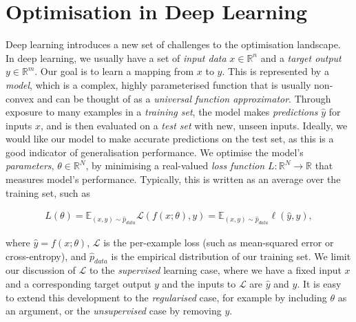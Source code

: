 \section{Optimisation in Deep Learning}

\label{sec:optimisation_in_deep_learning}






Deep learning introduces a new set of challenges to the optimisation landscape. In deep learning, we usually have a set of \textit{input data} $x \in \mathbb{R}^n$ and a \textit{target output} $y \in \mathbb{R}^m$. Our goal is to learn a mapping from $x$ to $y$. This is represented by a \textit{model}, which is a complex, highly parameterised function that is usually non-convex and can be thought of as a \textit{universal function approximator}. Through exposure to many examples in a \textit{training set}, the model makes \textit{predictions} $\hat{y}$ for inputs $x$, and is then evaluated on a \textit{test set} with new, unseen inputs. Ideally, we would like our model to make accurate predictions on the test set, as this is a good indicator of generalisation performance. We optimise the model's \textit{parameters}, $\theta \in \mathbb{R}^N$, by minimising a real-valued \textit{loss function} $L: \mathbb{R}^N \to \mathbb{R}$ that measures model's performance. Typically, this is written as an average over the training set, such as

\begin{align}

    L(\theta) = \mathbb{E}_{(x, y) \sim \hat{p}_{data}} \mathcal{L}(f(x; \theta), y) = \mathbb{E}_{(x, y) \sim \hat{p}_{data}} \ell(\hat{y}, y),

\end{align}

where $\hat{y} = f(x; \theta)$, $\mathcal{L}$ is the per-example loss (such as mean-squared error or cross-entropy), and $\hat{p}_{data}$ is the empirical distribution of our training set. We limit our discussion of $\mathcal{L}$ to the \textit{supervised} learning case, where we have a fixed input $x$ and a corresponding target output $y$ and the inputs to $\mathcal{L}$ are $\hat{y}$ and $y$. It is easy to extend this development to the \textit{regularised} case, for example by including $\theta$ as an argument, or the \textit{unsupervised} case by removing $y$. 



